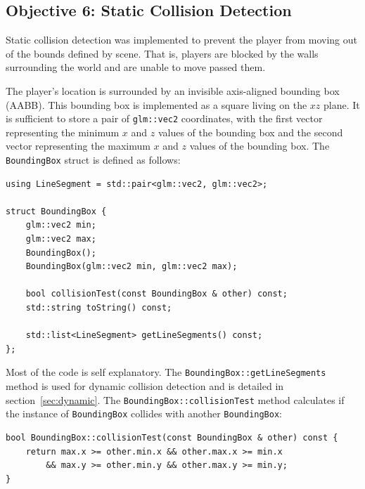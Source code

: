 \documentclass {article}
\begin{document}
\subsection{Objective 6: Static Collision Detection}\label{sec:static}
Static collision detection was implemented to prevent the player from moving out of the bounds defined by scene. That is, players are blocked by the walls surrounding the world and are unable to move passed them.

The player's location is surrounded by an invisible axis-aligned bounding box (AABB). This bounding box is implemented as a square living on the $xz$ plane. It is sufficient to store a pair of \texttt{glm::vec2} coordinates, with the first vector representing the minimum $x$ and $z$ values of the bounding box and the second vector representing the maximum $x$ and $z$ values of the bounding box. The \texttt{BoundingBox} struct is defined as follows:
\begin{verbatim}
using LineSegment = std::pair<glm::vec2, glm::vec2>;

struct BoundingBox {
    glm::vec2 min;
    glm::vec2 max;
    BoundingBox();
    BoundingBox(glm::vec2 min, glm::vec2 max);

    bool collisionTest(const BoundingBox & other) const;
    std::string toString() const;

    std::list<LineSegment> getLineSegments() const;
};
\end{verbatim}

Most of the code is self explanatory. The \texttt{BoundingBox::getLineSegments} method is used for dynamic collision detection and is detailed in section~\ref{sec:dynamic}. The \texttt{BoundingBox::collisionTest} method calculates if the instance of \texttt{BoundingBox} collides with another \texttt{BoundingBox}:
\begin{verbatim}
bool BoundingBox::collisionTest(const BoundingBox & other) const {
    return max.x >= other.min.x && other.max.x >= min.x
        && max.y >= other.min.y && other.max.y >= min.y;
}
\end{verbatim}
\end{document}
